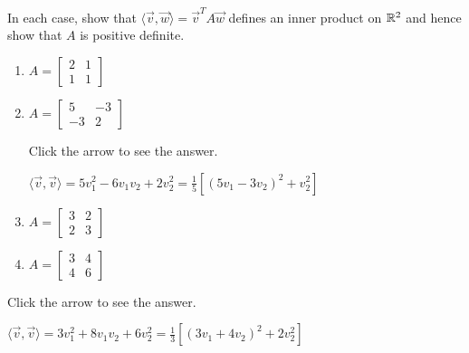 \documentclass{ximera}
\begin{document}
\begin{problem}\label{prob:inner_prod_12}
In each case, show that $\langle\vec{v}, \vec{w}\rangle = \vec{v}^{T}A\vec{w}$ defines an inner product on $\mathbb{R}^2$ and hence show that $A$ is positive definite.
\begin{enumerate}
\item
$A =
\left[ \begin{array}{rr}
2 & 1 \\
1 & 1
\end{array} \right]$

\item
$A =
\left[ \begin{array}{rr}
5 & -3 \\
-3 & 2
\end{array} \right]$

Click the arrow to see the answer.
\begin{expandable}
$  \langle \vec{v}, \vec{v} \rangle = 5v_1^2 - 6v_1v_2 + 2v_2^2 =
\frac{1}{5}[(5v_1 - 3v_2)^2 + v_2^2] $
\end{expandable}

\item
$A =
\left[ \begin{array}{rr}
3 & 2 \\
2 & 3
\end{array} \right]$

\item
$A =
\left[ \begin{array}{rr}
3 & 4 \\
4 & 6
\end{array} \right]$
\end{enumerate}

Click the arrow to see the answer.
\begin{expandable}
$ \langle \vec{v}, \vec{v} \rangle = 3v_1^2 + 8v_1v_2 + 6v_2^2 =
\frac{1}{3}[(3v_1 + 4v_2)^2 + 2v_2^2] $
\end{expandable}
\end{problem}
\end{document}
